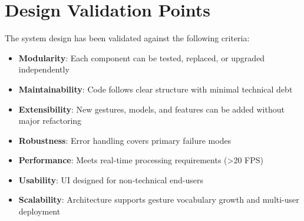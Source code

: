 \section{Design Validation Points}

The system design has been validated against the following criteria:

\begin{itemize}
    \item \textbf{Modularity}: Each component can be tested, replaced, or upgraded independently
    \item \textbf{Maintainability}: Code follows clear structure with minimal technical debt
    \item \textbf{Extensibility}: New gestures, models, and features can be added without major refactoring
    \item \textbf{Robustness}: Error handling covers primary failure modes
    \item \textbf{Performance}: Meets real-time processing requirements (\textgreater 20 FPS)
    \item \textbf{Usability}: UI designed for non-technical end-users
    \item \textbf{Scalability}: Architecture supports gesture vocabulary growth and multi-user deployment
\end{itemize}
